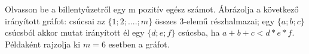 \documentclass[a4paper,12pt]{article}
\theoremstyle{definition}
\begin{document}
	\begin{question}
		Olvasson be a billentyűzetről egy m pozitív egész számot. Ábrázolja a következő irányított gráfot: csúcsai az $\{1; 2; ....;m\}$ összes 3-elemű részhalmazai; egy $\{a; b; c\}$ csúcsból akkor mutat irányított él egy $\{d; e; f\}$ csúcsba, ha $a + b + c < d * e * f$. Példaként rajzolja ki $m = 6$ esetben a gráfot. 		
	\end{question}
\end{document}
